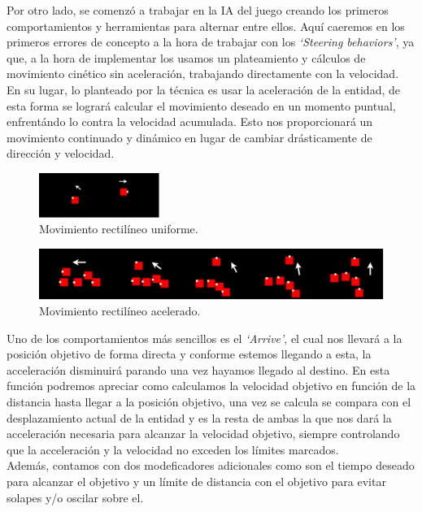 Por otro lado, se comenzó a trabajar en la \ac{IA} del juego creando los primeros comportamientos
y herramientas para alternar entre ellos. Aquí caeremos en los primeros errores de concepto a la
hora de trabajar con los \textit{`Steering behaviors'}, ya que, a la hora de implementar los
usamos un plateamiento y cálculos de movimiento cinético sin aceleración, trabajando directamente 
con la velocidad.\\
En su lugar, lo planteado por la técnica es usar la aceleración de la entidad, de esta forma se 
logrará calcular el movimiento deseado en un momento puntual, enfrentándo lo contra la velocidad 
acumulada. Esto nos proporcionará un movimiento continuado y dinámico en lugar de cambiar drásticamente de 
dirección y velocidad.

\begin{figure}[htb]
\centering
\includegraphics[width=0.35\textwidth]{imagenes/diario_desarrollo/mov1.png}
\caption{Movimiento rectilíneo uniforme.}
\label{fig:mru}
\end{figure} 

\begin{figure}[htb]
\centering
\includegraphics[width=1\textwidth]{imagenes/diario_desarrollo/mov2.png}
\caption{Movimiento rectilíneo acelerado.}
\label{fig:mra}
\end{figure} 

Uno de los comportamientos más sencillos es el \textit{`Arrive'}, el cual nos
llevará a la posición objetivo de forma directa y conforme estemos llegando a esta, la 
acceleración disminuirá parando una vez hayamos llegado al destino. En esta función podremos
apreciar como calculamos la velocidad objetivo en función de la distancia hasta llegar a
la posición objetivo, una vez se calcula se compara con el desplazamiento actual de la entidad
y es la resta de ambas la que nos dará la acceleración necesaria para alcanzar la velocidad
objetivo, siempre controlando que la acceleración y la velocidad no exceden los límites 
marcados.\\
Además, contamos con dos modeficadores adicionales como son el tiempo deseado para alcanzar el
objetivo y un límite de distancia con el objetivo para evitar solapes y/o oscilar sobre el.

